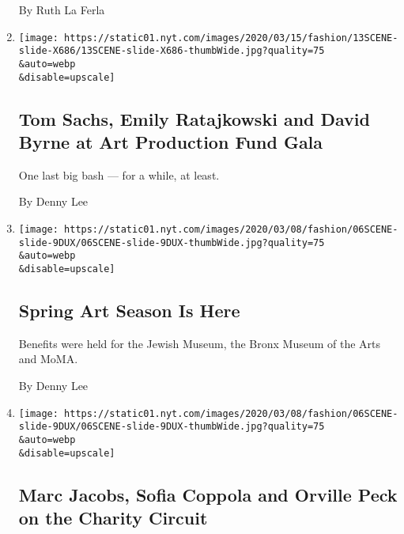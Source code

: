 \begin{enumerate}
  By Ruth La Ferla
\item
  \href{/slideshow/2020/03/13/fashion/tom-sachs-emily-ratajkowski-and-david-byrne-at-art-production-fund-gala.html}{}

  \texttt{[image: https://static01.nyt.com/images/2020/03/15/fashion/13SCENE-slide-X686/13SCENE-slide-X686-thumbWide.jpg?quality=75\\\&auto=webp\\\&disable=upscale]}

  \hypertarget{tom-sachs-emily-ratajkowski-and-david-byrne-at-art-production-fund-gala}{%
  \subsection{Tom Sachs, Emily Ratajkowski and David Byrne at Art
  Production Fund
  Gala}\label{tom-sachs-emily-ratajkowski-and-david-byrne-at-art-production-fund-gala}}

  One last big bash --- for a while, at least.

  By Denny Lee
\item
  \href{/2020/03/06/style/spring-art-season-is-here.html}{}

  \texttt{[image: https://static01.nyt.com/images/2020/03/08/fashion/06SCENE-slide-9DUX/06SCENE-slide-9DUX-thumbWide.jpg?quality=75\\\&auto=webp\\\&disable=upscale]}

  \hypertarget{spring-art-season-is-here}{%
  \subsection{Spring Art Season Is
  Here}\label{spring-art-season-is-here}}

  Benefits were held for the Jewish Museum, the Bronx Museum of the Arts
  and MoMA.

  By Denny Lee
\item
  \href{/slideshow/2020/03/06/fashion/marc-jacobs-sofia-coppola-and-orville-peck-on-the-charity-circuit.html}{}

  \texttt{[image: https://static01.nyt.com/images/2020/03/08/fashion/06SCENE-slide-9DUX/06SCENE-slide-9DUX-thumbWide.jpg?quality=75\\\&auto=webp\\\&disable=upscale]}

  \hypertarget{marc-jacobs-sofia-coppola-and-orville-peck-on-the-charity-circuit}{%
  \subsection{Marc Jacobs, Sofia Coppola and Orville Peck on the Charity
  Circuit}\label{marc-jacobs-sofia-coppola-and-orville-peck-on-the-charity-circuit}}


\end{enumerate}
